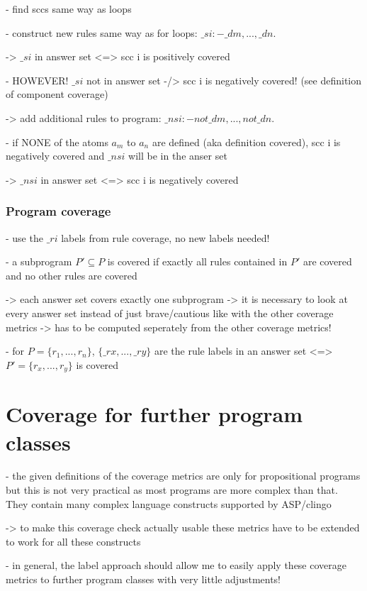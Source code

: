 - find sccs same way as loops

- construct new rules same way as for loops: $\_si :- \_dm, ... , \_dn$.

-> $\_si$ in answer set <=> scc i is positively covered

- HOWEVER! $\_si$ not in answer set -/> scc i is negatively covered! (see definition of component coverage)

-> add additional rules to program: $\_nsi :- not \_dm, ..., not \_dn$.

- if NONE of the atoms $a_m$ to $a_n$ are defined (aka definition covered), scc i is negatively covered and $\_nsi$ will be in the anser set

-> $\_nsi$ in answer set <=> scc i is negatively covered

\subsection{Program coverage}
\label{subsec:Computing coverage metrics for propositional programs/General approach/Program coverage}
- use the $\_ri$ labels from rule coverage, no new labels needed!

- a subprogram $P' \subseteq P$ is covered if exactly all rules contained in $P'$ are covered and no other rules are covered

-> each answer set covers exactly one subprogram -> it is necessary to look at every answer set instead of just brave/cautious like 
with the other coverage metrics -> has to be computed seperately from the other coverage metrics!

- for $P = \{r_1,...,r_n\}$,  $\{\_rx,...,\_ry\}$ are the rule labels in an answer set <=> $P'=\{r_x,...,r_y\}$ is covered

\chapter{Coverage for further program classes}
\label{ch:Coverage for further program classes}
- the given definitions of the coverage metrics are only for propositional programs but this is not very practical as most programs 
are more complex than that. They contain many complex language constructs supported by ASP/clingo

-> to make this coverage check actually usable these metrics have to be extended to work for all these constructs

- in general, the label approach should allow me to easily apply these coverage metrics to further program classes with very little 
adjustments!

